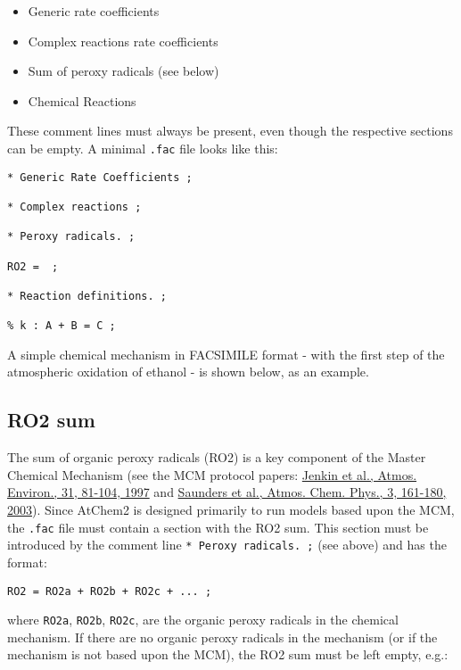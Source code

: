 \begin{itemize}
\item Generic rate coefficients
\item Complex reactions rate coefficients
\item Sum of peroxy radicals (see below)
\item Chemical Reactions
\end{itemize}

These comment lines must always be present, even though the respective
sections can be empty. A minimal \texttt{.fac} file looks like this:

\begin{verbatim}
* Generic Rate Coefficients ;

* Complex reactions ;

* Peroxy radicals. ;

RO2 =  ;

* Reaction definitions. ;

% k : A + B = C ;
\end{verbatim}

A simple chemical mechanism in FACSIMILE format - with the first step
of the atmospheric oxidation of ethanol - is shown below, as an
example.

\subsection{RO2 sum} \label{subsec:ro2-sum}

The sum of organic peroxy radicals (RO2) is a key component of the
Master Chemical Mechanism (see the MCM protocol papers:
\href{https://doi.org/10.1016/S1352-2310(96)00105-7}{Jenkin et al.,
  Atmos. Environ., 31, 81-104, 1997} and
\href{https://doi.org/10.5194/acp-3-161-2003}{Saunders et al., Atmos.
  Chem. Phys., 3, 161-180, 2003}). Since AtChem2 is designed primarily
to run models based upon the MCM, the \texttt{.fac} file must contain
a section with the RO2 sum. This section must be introduced by the
comment line \texttt{*\ Peroxy\ radicals.\ ;} (see above) and has the
format:

\begin{verbatim}
RO2 = RO2a + RO2b + RO2c + ... ;
\end{verbatim}

where \texttt{RO2a}, \texttt{RO2b}, \texttt{RO2c}, are the organic
peroxy radicals in the chemical mechanism. If there are no organic
peroxy radicals in the mechanism (or if the mechanism is not based
upon the MCM), the RO2 sum must be left empty, e.g.:

